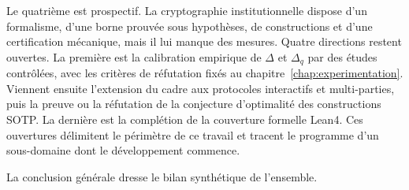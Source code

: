 \begin{sloppypar}
Le quatri\`eme est prospectif. La cryptographie institutionnelle dispose d'un
formalisme, d'une borne prouv\'ee sous hypoth\`eses, de constructions et d'une
certification m\'ecanique, mais il lui manque des mesures. Quatre directions
restent ouvertes. La premi\`ere est la calibration empirique de $\Delta$ et $\Delta_q$ par des
\'etudes contr\^ol\'ees, avec les crit\`eres de r\'efutation fix\'es au
chapitre~\ref{chap:experimentation}. Viennent ensuite l'extension du cadre aux protocoles
interactifs et multi-parties, puis la preuve ou la r\'efutation de la conjecture
d'optimalit\'e des constructions SOTP. La derni\`ere est la compl\'etion de la couverture
formelle Lean4. Ces ouvertures d\'elimitent le p\'erim\`etre de ce travail et
tracent le programme d'un sous-domaine dont le d\'eveloppement commence.

La conclusion g\'en\'erale dresse le bilan synth\'etique de l'ensemble.
\end{sloppypar}
